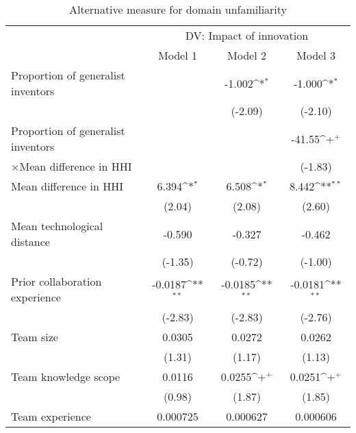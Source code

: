 \begin{table}[htbp]\centering
\def\sym#1{\ifmmode^{#1}\else\(^{#1}\)\fi}
\caption{Alternative measure for domain unfamiliarity\label{hhidiff}}
\begin{tabular}{l*{3}{c}}
    \toprule
    &\multicolumn{3}{c}{DV: Impact of innovation}\\
    \cmidrule(lr){2-4}
    &\multicolumn{1}{c}{Model 1}&\multicolumn{1}{c}{Model 2}&\multicolumn{1}{c}{Model 3}\\
    \midrule
Proportion of generalist inventors&                     &      -1.002\sym{*}  &      -1.000\sym{*}  \\
                    &                     &     (-2.09)         &     (-2.10)         \\
\addlinespace
Proportion of generalist inventors&                     &                     &      -41.55\sym{+}  \\
$\times$Mean difference in HHI                    &                     &                     &     (-1.83)         \\
\addlinespace
Mean difference in HHI            &       6.394\sym{*}  &       6.508\sym{*}  &       8.442\sym{**} \\
                    &      (2.04)         &      (2.08)         &      (2.60)         \\
\addlinespace
Mean technological distance&      -0.590         &      -0.327         &      -0.462         \\
                    &     (-1.35)         &     (-0.72)         &     (-1.00)         \\
\addlinespace
Prior collaboration experience&     -0.0187\sym{**} &     -0.0185\sym{**} &     -0.0181\sym{**} \\
                    &     (-2.83)         &     (-2.83)         &     (-2.76)         \\
\addlinespace
Team size           &      0.0305         &      0.0272         &      0.0262         \\
                    &      (1.31)         &      (1.17)         &      (1.13)         \\
\addlinespace
Team knowledge scope&      0.0116         &      0.0255\sym{+}  &      0.0251\sym{+}  \\
                    &      (0.98)         &      (1.87)         &      (1.85)         \\
\addlinespace
Team experience     &    0.000725         &    0.000627         &    0.000606         \\

\end{tabular}
\end{table}
